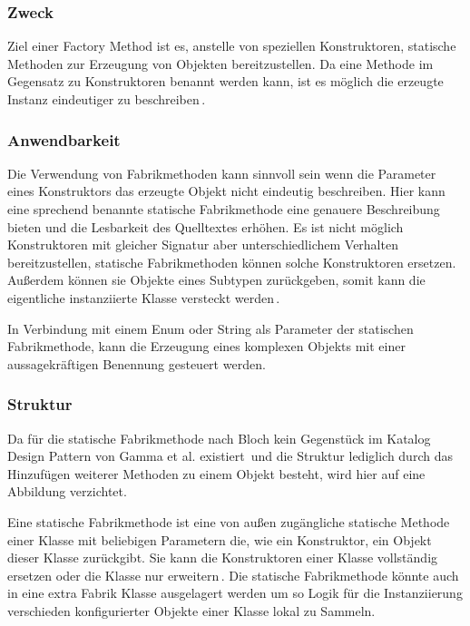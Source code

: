 \documentclass[12pt,oneside,a4paper,parskip]{scrbook}
\begin{document}
\subsubsection{Zweck}

Ziel einer Factory Method ist es, anstelle von speziellen Konstruktoren, statische Methoden zur Erzeugung von Objekten bereitzustellen. Da eine Methode im Gegensatz zu Konstruktoren benannt werden kann, ist es möglich die erzeugte Instanz eindeutiger zu beschreiben\,\cite[S. 5f]{bloch2017}. 

\subsubsection{Anwendbarkeit}

Die Verwendung von Fabrikmethoden kann sinnvoll sein wenn die Parameter eines Konstruktors das erzeugte Objekt nicht eindeutig beschreiben. Hier kann eine sprechend benannte statische Fabrikmethode eine genauere Beschreibung bieten und die Lesbarkeit des Quelltextes erhöhen. Es ist nicht möglich Konstruktoren mit gleicher Signatur aber unterschiedlichem Verhalten bereitzustellen, statische Fabrikmethoden können solche Konstruktoren ersetzen. Außerdem können sie Objekte eines Subtypen zurückgeben, somit kann die eigentliche instanziierte Klasse versteckt werden\,\cite[S. 5ff]{bloch2017}.

In Verbindung mit einem Enum oder String als Parameter der statischen Fabrikmethode, kann die Erzeugung eines komplexen Objekts mit einer aussagekräftigen Benennung gesteuert werden.

\subsubsection{Struktur}

Da für die statische Fabrikmethode nach Bloch kein Gegenstück im Katalog Design Pattern von Gamma et al. existiert\,\cite[S. 5]{bloch2017} und die Struktur lediglich durch das Hinzufügen weiterer Methoden zu einem Objekt besteht, wird hier auf eine Abbildung verzichtet. 

Eine statische Fabrikmethode ist eine von außen zugängliche statische Methode einer Klasse mit beliebigen Parametern die, wie ein Konstruktor, ein Objekt dieser Klasse zurückgibt. Sie kann die Konstruktoren einer Klasse vollständig ersetzen oder die Klasse nur erweitern\,\cite[S. 5f]{bloch2017}. Die statische Fabrikmethode könnte auch in eine extra Fabrik Klasse ausgelagert werden um so Logik für die Instanziierung verschieden konfigurierter Objekte einer Klasse lokal zu Sammeln.
\end{document}
